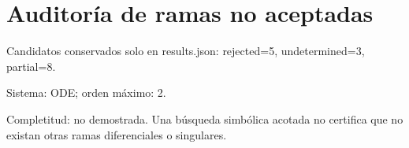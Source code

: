 \documentclass[10pt]{article}
\begin{document}
\section*{Auditoría de ramas no aceptadas}
Candidatos conservados solo en results.json: rejected=5, undetermined=3, partial=8.\par
Sistema: ODE; orden máximo: 2.\par
Completitud: no demostrada. Una búsqueda simbólica acotada no certifica que no existan otras ramas diferenciales o singulares.\par
\end{document}
